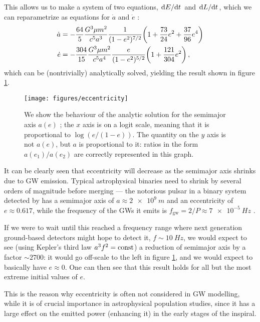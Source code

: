 \documentclass[main.tex]{subfiles}
\begin{document}
This allows us to make a system of two equations, \(\dv*{E}{t}\) and \(\dv*{L}{t}\), which we can reparametrize as equations for \(\dot{a}\) and \(\dot{e}\) \cite[eqs.\ 4.116--17]{maggioreGravitationalWavesVolume2007}: 
%
\begin{align}
\dot{a} &= - \frac{64}{5} \frac{G^3 \mu m^2}{c^{5} a^3}
\frac{1}{(1-e^2)^{7/2}} \qty(1 + \frac{73}{24} e^2 + \frac{37}{96}e^{4})  \\
\dot{e} &= - \frac{304}{15}  \frac{G^3 \mu m^2}{c^{5} a^4} 
\frac{e}{(1-e^2)^{5/2}} \qty(1 + \frac{121}{304} e^2)
\,,
\end{align}
%
which can be (nontrivially) analytically solved, yielding the result shown in figure \ref{fig:eccentricity}. 

\begin{figure}[ht]
\centering
\texttt{[image: figures/eccentricity]}
\caption{We show the behaviour of the analytic solution for the semimajor axis \(a(e)\) \cite[eq.\ 4.126]{maggioreGravitationalWavesVolume2007}; the \(x\) axis is on a logit scale, meaning that it is proportional to \(\log (e / (1-e))\). The quantity on the \(y\) axis is not \(a(e)\), but \(a\) is proportional to it: ratios in the form \(a(e_1) / a(e_2)\) are correctly represented in this graph.}
\label{fig:eccentricity}
\end{figure}

It can be clearly seen that eccentricity will decrease as the semimajor axis shrinks due to \ac{GW} emission.
Typical astrophysical binaries need to shrink by several orders of magnitude before merging --- the notorious pulsar in a binary system detected by \textcite{hulseDiscoveryPulsarBinary1975} has a semimajor axis of \(a \approx \SI{2e9}{m}\) and an eccentricity of \(e \approx 0.617\), while the frequency of the \acsp{GW} it emits is \(f _{\text{gw}} = 2 / P \approx \SI{7e-5}{Hz}\) \cite{taylorNewTestGeneral1982}. 

If we were to wait until this reached a frequency range where next generation ground-based detectors might hope to detect it, \(f \sim \SI{10}{Hz}\), we would expect to see (using Kepler's third law \(a^3 f^2 = \mathrm{const}\)) a reduction of semimajor axis by a factor \(\sim 2700\): it would go off-scale to the left in figure \ref{fig:eccentricity}, and we would expect to basically have \(e \approx 0\). 
One can then see that this result holds for all but the most extreme initial values of \(e\). 

This is the reason why eccentricity is often not considered in \ac{GW} modelling, while it is of crucial importance in astrophysical population studies, since it has a large effect on the emitted power (enhancing it) in the early stages of the inspiral.
\end{document}
